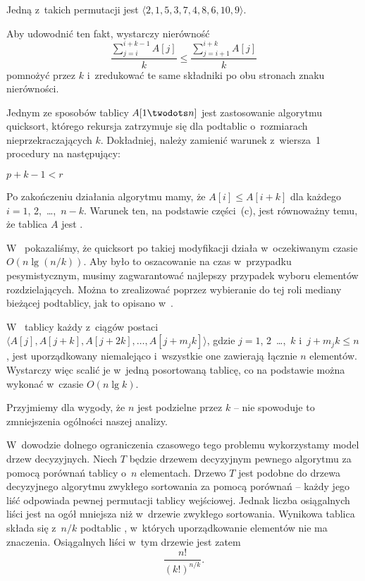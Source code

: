 \subproblem %
Jedną z~takich permutacji jest $\langle2,1,5,3,7,4,8,6,10,9\rangle$.

\subproblem %
Aby udowodnić ten fakt, wystarczy nierówność
\[
	\frac{\sum_{j=i}^{i+k-1}A[j]}{k} \le \frac{\sum_{j=i+1}^{i+k}A[j]}{k}
\]
pomnożyć przez $k$ i~zredukować te same składniki po obu stronach znaku nierówności.

\subproblem %
Jednym ze sposobów  tablicy $A[1\twodots n]$ jest zastosowanie algorytmu quicksort, którego rekursja zatrzymuje się dla podtablic o~rozmiarach nieprzekraczających $k$.
Dokładniej, należy zamienić warunek z~wiersza~1 procedury  na następujący:
\begin{codebox}
\li	\If $p+k-1<r$
\end{codebox}
Po zakończeniu działania algorytmu mamy, że $A[i]\le A[i+k]$ dla każdego $i=1$, 2,~\dots,~$n-k$.
Warunek ten, na podstawie części~(c), jest równoważny temu, że tablica $A$ jest .

W~ pokazaliśmy, że quicksort po takiej modyfikacji działa w~oczekiwanym czasie $O(n\lg(n/k))$.
Aby było to oszacowanie na czas w~przypadku pesymistycznym, musimy zagwarantować najlepszy przypadek wyboru elementów rozdzielających.
Można to zrealizować poprzez wybieranie do tej roli mediany bieżącej podtablicy, jak to opisano w~.

\subproblem %
W~ tablicy każdy z~ciągów postaci $\langle A[j],A[j+k],A[j+2k],\dots,A[j+m_jk]\rangle$, gdzie $j=1$, 2~\dots,~$k$ i~$j+m_jk\le n$, jest uporządkowany niemalejąco i~wszystkie one zawierają łącznie $n$ elementów.
Wystarczy więc scalić je w~jedną posortowaną tablicę, co na podstawie  można wykonać w~czasie $O(n\lg k)$.

\subproblem %
Przyjmiemy dla wygody, że $n$ jest podzielne przez $k$ -- nie spowoduje to zmniejszenia ogólności naszej analizy.

W~dowodzie dolnego ograniczenia czasowego tego problemu wykorzystamy model drzew decyzyjnych.
Niech $T$ będzie drzewem decyzyjnym pewnego algorytmu  za pomocą porównań tablicy o~$n$ elementach.
Drzewo $T$ jest podobne do drzewa decyzyjnego algorytmu zwykłego sortowania za pomocą porównań -- każdy jego liść odpowiada pewnej permutacji tablicy wejściowej.
Jednak liczba osiągalnych liści jest na ogół mniejsza niż w~drzewie zwykłego sortowania.
Wynikowa tablica składa się z~$n/k$ podtablic , w~których uporządkowanie elementów nie ma znaczenia.
Osiągalnych liści w~tym drzewie jest zatem
\[
    \frac{n!}{(k!)^{n/k}}.
\]

